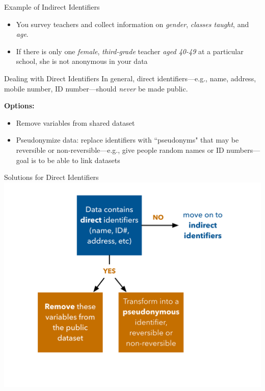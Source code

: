 \documentclass[12pt, compress]{beamer} %
\let\noteitem\item %
\renewcommand{\item}{ 
	\noteitem\vspace{\fill}
	}
\begin{document}
	\begin{frame}{Example of Indirect Identifiers}	
		\begin{itemize}
			\item You survey teachers and collect information on \textit{gender}, \textit{classes taught}, and \textit{age}.
			\item If there is only one \textit{female}, \textit{third-grade} teacher \textit{aged 40-49} at a particular school, she is not anonymous in your data
		\end{itemize}
	\end{frame}		

	\begin{frame}{Dealing with Direct Identifiers}
		In general, direct identifiers---e.g., name, address, mobile number, ID number---should \textit{never} be made public. 
		
		\bigskip
			
		\textbf{Options:}
		\begin{itemize}
			\item Remove variables from shared dataset
			\item Pseudonymize data: replace identifiers with ``pseudonyms" that may be reversible or non-reversible---e.g., give people random names or ID numbers---goal is to be able to link datasets
		\end{itemize}
	\end{frame}	
	
	\begin{frame}{Solutions for Direct Identifiers}
		 \centering \includegraphics[width=.9\textwidth]{de-identification_direct.png}
	\end{frame}
	
\end{document}
